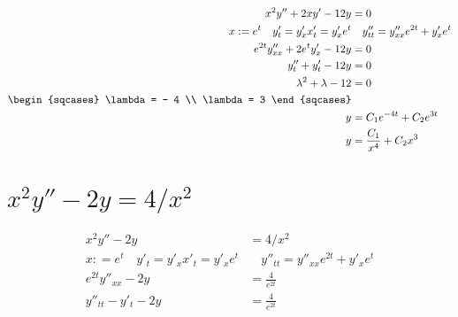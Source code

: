 \begin{align*}
    x^2y''+2xy'-12y                                                  & = 0                                            \\
    x : = e^t                      \quad y'_t = y'_x x'_t = y'_x e^t & \quad y''_{tt} = y''_{x x} e^{2t} + y'_x e^{t} \\
    e^{2t} y''_{xx} + 2e^t y'_x - 12y                                & = 0                                            \\
    y''_t + y'_t - 12y                                               & = 0                                            \\
    \lambda^2 + \lambda - 12                                         & = 0                                            \\
    \begin{sqcases}
        \lambda = - 4 \\
        \lambda = 3
    \end{sqcases}                                                                                        \\
    y                                                                & = C_1e^{ - 4t} + C_2e^{3t}                     \\
    y                                                                & = \frac{C_1}{x^4} + C_2x^3                     \\
\end{align*}

\section{$x^2y''-2y=4/x^2$}

\begin{align*}
    x^2y''-2y                                                        & = 4/x^2                                        \\
    x : = e^t                      \quad y'_t = y'_x x'_t = y'_x e^t & \quad y''_{tt} = y''_{x x} e^{2t} + y'_x e^{t} \\
    e^{2t}y''_{x x} - 2y                                             & =  \frac{4}{e^{2t}}                            \\
    y''_{tt} - y'_t - 2y                                             & =  \frac{4}{e^{2t}}                            \\
\end{align*}

